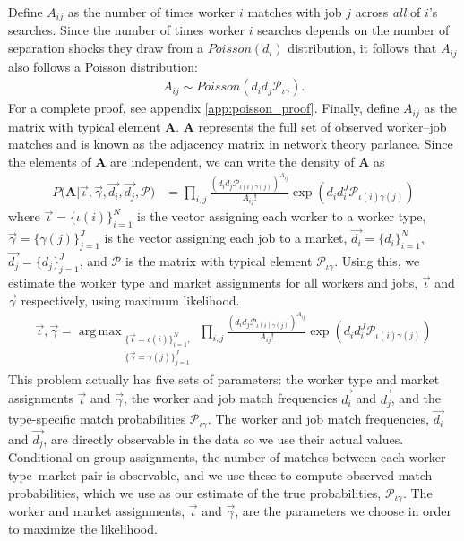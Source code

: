 \documentclass[12pt]{article}
\def\ig{\iota\gamma}
\def\g{\gamma}
\def\i{\iota}
\DeclareMathOperator*{\argmax}{arg\,max}
\theoremstyle{definition}
\theoremstyle{plain}
\begin{document}
Define $A_{ij}$ as the number of times worker $i$ matches with job $j$ across \emph{all} of $i$'s searches. Since the number of times worker $i$ searches depends on the number of separation shocks they draw from a $Poisson(d_i)$ distribution, it follows that $A_{ij}$ also follows a Poisson distribution:
\begin{align}
 A_{ij} \sim  Poisson \left( d_i d_j \mathcal{P}_{\ig}  \right).
\end{align}
For a complete proof, see appendix \ref{app:poisson_proof}. Finally, define $A_{ij}$ as the matrix with typical element $\mathbf{A}$. $\mathbf{A}$ represents the full set of observed worker--job matches and is known as the adjacency matrix in network theory parlance. Since the elements of $\mathbf{A}$ are independent, we can write the density of $\mathbf{A}$ as 
\begin{align} 
P \bigg(\mathbf{A} \bigg|\vec{\i}, \vec{\g}, \vec{d_i}, \vec{d_j} , \mathbf{\mathcal{P}} \bigg)  
&= \prod_{ i,j } \frac{\left(d_i d_j \mathcal{P}_{\i(i)\g(j)}\right)^{A_{ij}}}{A_{ij}!} \exp \left(d_i d_i^J \mathcal{P}_{\i(i)\g(j)} \right)  \label{eq:BiSBM}
\end{align} 
where $\vec{\i} = \{\i(i)\}_{i=1}^N$ is the vector assigning each worker to a worker type, $\vec{\g} = \{\g(j)\}_{j=1}^J$ is the vector assigning each job to a market, $\vec{d_i} = \{d_i\}_{i=1}^N$, $\vec{d_j} = \{d_j\}_{j=1}^J$,  and $\mathbf{\mathcal{P}}$ is the matrix with typical element $\mathcal{P}_{\i\g}$. Using this, we estimate the worker type and market assignments for all workers and jobs, $\vec{\i}$ and $\vec{\g}$ respectively, using maximum likelihood.
\begin{align}
\vec{\i},\vec{\g} = \argmax_{\begin{matrix} \{\vec{\i}=\i(i)\}_{i=1}^N, \\ \{\vec{\g}=\g(j)\}_{j=1}^J \end{matrix}}  \prod_{ i,j } \frac{\left(d_i d_j  \mathcal{P}_{\i(i)\g(j)}\right)^{A_{ij}}}{A_{ij}!} \exp \left(d_i d_i^J  \mathcal{P}_{\i(i)\g(j)}\right) \label{eq:BiSBM_max_likelihood}
\end{align}
This problem actually has five sets of parameters: the worker type and market assignments $\vec{\i}$ and $\vec{\g}$, the worker and job match frequencies $\vec{d_i}$ and $\vec{d_j}$, and the type-specific match probabilities $\mathcal{P}_{\ig}$. The worker and job match frequencies, $\vec{d_i}$ and $\vec{d_j}$, are directly observable in the data so we use their actual values. Conditional on group assignments, the number of matches between each worker type--market pair is observable, and we use these to compute observed match probabilities, which we use as our estimate of the true probabilities, $\mathcal{P}_{\ig}$. The worker and market assignments, $\vec{\i}$ and $\vec{\g}$, are the parameters we choose in order to maximize the likelihood. 
\end{document}
